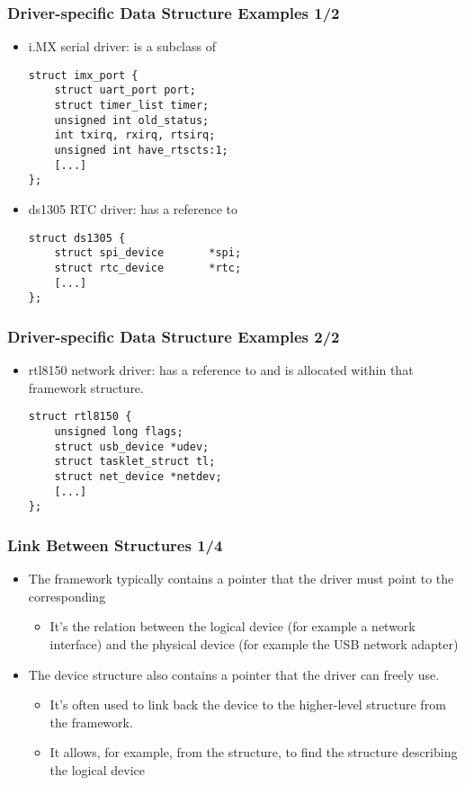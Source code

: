 \begin{frame}[fragile]
  \frametitle{Driver-specific Data Structure Examples 1/2}
  \begin{itemize}
  \item i.MX serial driver:  is a subclass of
  \begin{verbatim}
struct imx_port {
    struct uart_port port;
    struct timer_list timer;
    unsigned int old_status;
    int txirq, rxirq, rtsirq;
    unsigned int have_rtscts:1;
    [...]
};
  \end{verbatim}
  \item ds1305 RTC driver:  has a reference to
  \begin{verbatim}
struct ds1305 {
    struct spi_device       *spi;
    struct rtc_device       *rtc;
    [...]
};
  \end{verbatim}
  \end{itemize}
\end{frame}

\begin{frame}[fragile]
  \frametitle{Driver-specific Data Structure Examples 2/2}
  \begin{itemize}
  \item rtl8150 network driver:  has a reference to
     and is allocated within that framework structure.
  \begin{verbatim}
struct rtl8150 {
    unsigned long flags;
    struct usb_device *udev;
    struct tasklet_struct tl;
    struct net_device *netdev;
    [...]
};
  \end{verbatim}
  \end{itemize}
\end{frame}

\begin{frame}
  \frametitle{Link Between Structures 1/4}
  \begin{itemize}
  \item The framework typically contains a  \code{*}
    pointer that the driver must point to the corresponding
    \begin{itemize}
    \item It's the relation between the logical device (for example a
      network interface) and the physical device (for example the USB
      network adapter)
    \end{itemize}
  \item The device structure also contains a  pointer
    that the driver can freely use.
    \begin{itemize}
    \item It's often used to link back the device to the higher-level
      structure from the framework.
    \item It allows, for example, from the 
      structure, to find the structure describing the logical device
    \end{itemize}
  \end{itemize}
\end{frame}

